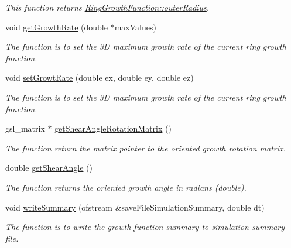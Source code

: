 \begin{DoxyCompactItemize}
\begin{DoxyCompactList}\small\item\em This function returns \hyperlink{classRingGrowthFunction_a8b7d5268d9d47f112b56feef58193649}{Ring\+Growth\+Function\+::outer\+Radius}. \end{DoxyCompactList}\item 
void \hyperlink{classRingGrowthFunction_ab3cc1858fb602ab40a74af7d0467c13b}{get\+Growth\+Rate} (double $\ast$max\+Values)
\begin{DoxyCompactList}\small\item\em The function is to set the 3\+D maximum growth rate of the current ring growth function. \end{DoxyCompactList}\item 
void \hyperlink{classRingGrowthFunction_a051da280e649c81afff38a1a45cb035a}{set\+Growt\+Rate} (double ex, double ey, double ez)
\begin{DoxyCompactList}\small\item\em The function is to set the 3\+D maximum growth rate of the current ring growth function. \end{DoxyCompactList}\item 
\hypertarget{classRingGrowthFunction_a05f880ba6df8b3001a8e8fdec5ba1ad6}{}gsl\+\_\+matrix $\ast$ \hyperlink{classRingGrowthFunction_a05f880ba6df8b3001a8e8fdec5ba1ad6}{get\+Shear\+Angle\+Rotation\+Matrix} ()\label{classRingGrowthFunction_a05f880ba6df8b3001a8e8fdec5ba1ad6}

\begin{DoxyCompactList}\small\item\em The function return the matrix pointer to the oriented growth rotation matrix. \end{DoxyCompactList}\item 
\hypertarget{classRingGrowthFunction_aa70523c66dce48e7e54360596787a629}{}double \hyperlink{classRingGrowthFunction_aa70523c66dce48e7e54360596787a629}{get\+Shear\+Angle} ()\label{classRingGrowthFunction_aa70523c66dce48e7e54360596787a629}

\begin{DoxyCompactList}\small\item\em The function returns the oriented growth angle in radians (double). \end{DoxyCompactList}\item 
void \hyperlink{classRingGrowthFunction_a681175045cf09fadd92921e129737e65}{write\+Summary} (ofstream \&save\+File\+Simulation\+Summary, double dt)
\begin{DoxyCompactList}\small\item\em The function is to write the growth function summary to simulation summary file. \end{DoxyCompactList}\end{DoxyCompactItemize}
